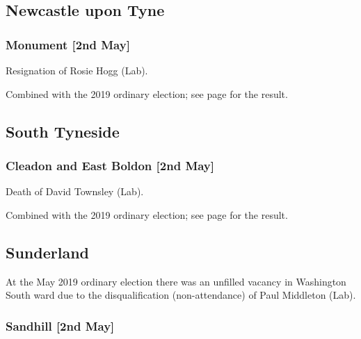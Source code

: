 \documentclass[a4paper,openany]{book}
\begin{document}
\begin{resultsiii}
\subsection*{Newcastle upon Tyne}

\subsubsection*{Monument \hspace*{\fill}\nolinebreak[1]%
	\enspace\hspace*{\fill}
	[2nd May]}


Resignation of Rosie Hogg (Lab).

Combined with the 2019 ordinary election; see page \pageref{NewcastleTyneMonument} for the result.

\subsection*{South Tyneside}

\subsubsection*{Cleadon and East Boldon \hspace*{\fill}\nolinebreak[1]%
	\enspace\hspace*{\fill}
	[2nd May]}


Death of David Townsley (Lab).

Combined with the 2019 ordinary election; see page \pageref{SouthTynesideCleadonEastBoldon} for the result.

\subsection*{Sunderland}

At the May 2019 ordinary election there was an unfilled vacancy in Washington South ward due to the disqualification (non-attendance) of Paul Middleton (Lab).

\subsubsection*{Sandhill \hspace*{\fill}\nolinebreak[1]%
	\enspace\hspace*{\fill}
	[2nd May]}


\end{resultsiii}
\end{document}
